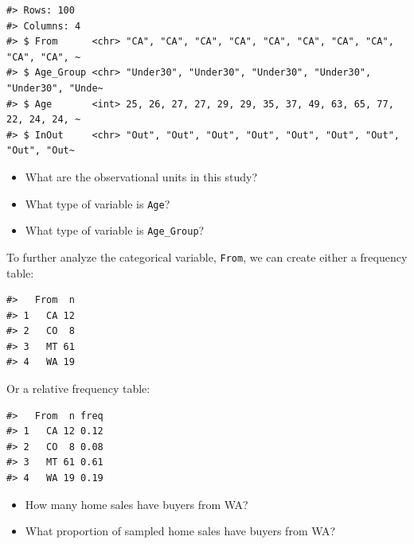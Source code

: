\documentclass[
]{report}
\providecommand{\tightlist}{%
  \setlength{\itemsep}{0pt}\setlength{\parskip}{0pt}}
\begin{document}
\begin{verbatim}
#> Rows: 100
#> Columns: 4
#> $ From      <chr> "CA", "CA", "CA", "CA", "CA", "CA", "CA", "CA", "CA", "CA", ~
#> $ Age_Group <chr> "Under30", "Under30", "Under30", "Under30", "Under30", "Unde~
#> $ Age       <int> 25, 26, 27, 27, 29, 29, 35, 37, 49, 63, 65, 77, 22, 24, 24, ~
#> $ InOut     <chr> "Out", "Out", "Out", "Out", "Out", "Out", "Out", "Out", "Out~
\end{verbatim}

\begin{itemize}
\tightlist
\item
  What are the observational units in this study?
\end{itemize}

\vspace{0.3in}

\begin{itemize}
\tightlist
\item
  What type of variable is \texttt{Age}?
\end{itemize}

\vspace{0.3in}

\begin{itemize}
\tightlist
\item
  What type of variable is \texttt{Age\_Group}?
\end{itemize}

To further analyze the categorical variable, \texttt{From}, we can create either a frequency table:

\begin{verbatim}
#>   From  n
#> 1   CA 12
#> 2   CO  8
#> 3   MT 61
#> 4   WA 19
\end{verbatim}

Or a relative frequency table:

\begin{verbatim}
#>   From  n freq
#> 1   CA 12 0.12
#> 2   CO  8 0.08
#> 3   MT 61 0.61
#> 4   WA 19 0.19
\end{verbatim}

\begin{itemize}
\tightlist
\item
  How many home sales have buyers from WA?
\end{itemize}

\vspace{0.2in}

\begin{itemize}
\tightlist
\item
  What proportion of sampled home sales have buyers from WA?
\end{itemize}
\end{document}

